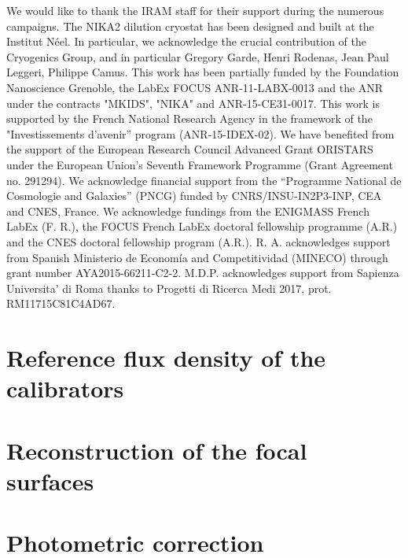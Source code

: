 \documentclass[traditionalabstract]{aa}
\begin{document}
\begin{acknowledgements}
  We would like to thank the IRAM staff for their support during the
  numerous campaigns. 
  The NIKA2 dilution cryostat has been designed and built at the Institut N\'eel. 
  In particular, we acknowledge the crucial contribution of the Cryogenics Group, and 
  in particular Gregory Garde, Henri Rodenas, Jean Paul Leggeri, Philippe Camus. 
  This work has been partially funded by the Foundation Nanoscience
  Grenoble, the LabEx FOCUS ANR-11-LABX-0013 and the ANR under the
  contracts "MKIDS", "NIKA" and ANR-15-CE31-0017. This work is
  supported by the French National Research Agency in the framework of
  the "Investissements d’avenir” program (ANR-15-IDEX-02).
  We have benefited from the support of the European Research Council Advanced
  Grant ORISTARS under the European Union's Seventh Framework
  Programme (Grant Agreement no. 291294). We acknowledge financial
  support from the “Programme National de Cosmologie and Galaxies”
  (PNCG) funded by CNRS/INSU-IN2P3-INP, CEA and CNES, France.
  We acknowledge fundings from the ENIGMASS French LabEx (F. R.), the FOCUS French
  LabEx doctoral fellowship programme (A.R.) and the CNES doctoral
  fellowship program (A.R.). R. A. acknowledges support from
  Spanish Ministerio de Econom\'ia and Competitividad (MINECO) through
  grant number AYA2015-66211-C2-2. M.D.P. acknowledges support from
  Sapienza Universita' di Roma thanks to Progetti di Ricerca Medi 2017,
  prot. RM11715C81C4AD67. 
\end{acknowledgements}

%
%

\begin{appendix}
  \section{Reference flux density of the calibrators}
  \label{ap:ref_flux_calibrator}
  
  
  \section{Reconstruction of the focal surfaces}
  \label{ap:focus_surfaces}
  

  \section{Photometric correction}
  \label{se:photometric_correction}
  
\end{appendix}

%
\end{document}
